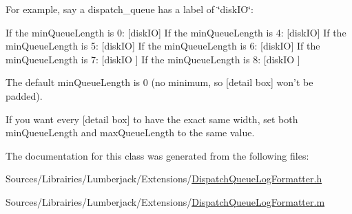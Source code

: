 For example, say a dispatch\-\_\-queue has a label of \char`\"{}disk\-I\-O\char`\"{}\-:

If the min\-Queue\-Length is 0\-: \mbox{[}disk\-I\-O\mbox{]} If the min\-Queue\-Length is 4\-: \mbox{[}disk\-I\-O\mbox{]} If the min\-Queue\-Length is 5\-: \mbox{[}disk\-I\-O\mbox{]} If the min\-Queue\-Length is 6\-: \mbox{[}disk\-I\-O\mbox{]} If the min\-Queue\-Length is 7\-: \mbox{[}disk\-I\-O \mbox{]} If the min\-Queue\-Length is 8\-: \mbox{[}disk\-I\-O \mbox{]}

The default min\-Queue\-Length is 0 (no minimum, so \mbox{[}detail box\mbox{]} won't be padded).

If you want every \mbox{[}detail box\mbox{]} to have the exact same width, set both min\-Queue\-Length and max\-Queue\-Length to the same value. 

The documentation for this class was generated from the following files\-:\begin{DoxyCompactItemize}
\item 
Sources/\-Librairies/\-Lumberjack/\-Extensions/\hyperlink{_dispatch_queue_log_formatter_8h}{Dispatch\-Queue\-Log\-Formatter.\-h}\item 
Sources/\-Librairies/\-Lumberjack/\-Extensions/\hyperlink{_dispatch_queue_log_formatter_8m}{Dispatch\-Queue\-Log\-Formatter.\-m}\end{DoxyCompactItemize}
